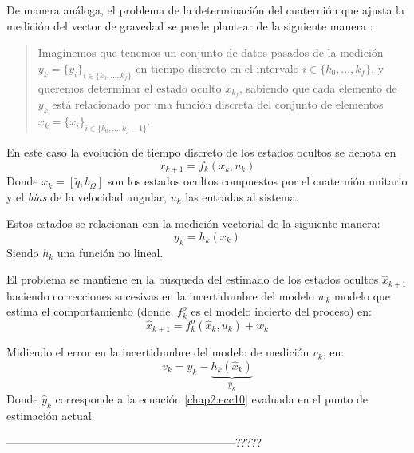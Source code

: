 \documentclass[conference]{IEEEtran}
\begin{document}
De manera análoga, el problema de la determinación del cuaternión que ajusta la medición del vector de gravedad se puede plantear de la siguiente manera \cite{Merwe2004}: 
\begin{quote} Imaginemos que tenemos un conjunto de datos pasados de la medición $y_k=\{y_i\}_{i\in\{k_0,...,k_f\}}$ en tiempo discreto en el intervalo $i\in\{k_0,...,k_f\}$, y queremos determinar el estado oculto $x_{k_f}$, sabiendo que cada elemento de $y_k$ está relacionado por una función discreta del conjunto de elementos $x_k=\{x_i\}_{i\in\{k_0,...,k_f-1\}}$.\end{quote}
En este caso la evolución de tiempo discreto de los estados ocultos se denota en
\begin{equation}
\label{chap2:ecc1}
x_{k+1}=f_k(x_k,u_k)
\end{equation} 
Donde $x_k=[\breve{q},b_\Omega]$ son los estados ocultos compuestos por el cuaternión unitario y el \emph{bias} de la velocidad angular, $u_k$ las entradas al sistema. \par Estos estados se relacionan con la medición vectorial de la siguiente manera:
\begin{equation}
\label{chap2:ecc10}
y_{k}=h_k(x_k)
\end{equation} 
Siendo $h_k$ una función no lineal.\par El problema se mantiene en la búsqueda del estimado de los estados ocultos $\hat{x}_{k+1}$ haciendo correcciones sucesivas en la incertidumbre del modelo $w_k$ modelo que estima el comportamiento (donde, $f^o_k$ es el modelo incierto del proceso) en:
\begin{equation}
\label{chap2:ecc11}
\hat{x}_{k+1}=f^o_k(\hat{x}_k,u_k)+w_k
\end{equation}
\par
Midiendo el error en la incertidumbre del modelo de medición $v_k$, en:
\begin{equation}
\label{chap2:ecc4}
v_k=y_k-\underbrace{h_k(\hat{x}_k)}_{\hat{y}_k}
\end{equation}
Donde $\hat{y}_k$ corresponde a la ecuación \ref{chap2:ecc10} evaluada en el punto de estimación actual.\par
--------------------------------------------------------------?????
\end{document}
